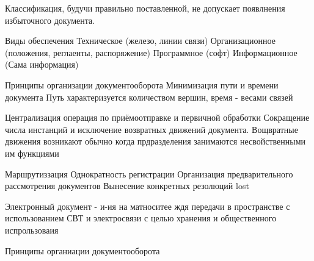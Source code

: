 \documentclass[a4paper,12pt]{report}
\begin{document}
		Классификация, будучи правильно поставленной, не допускает появлнения избыточного документа.

		Виды обеспечения
			Техническое (железо, линии связи)
			Организационное (положения, реглаенты, распоряжение)
			Программное (софт)
			Информационное (Сама информация)



		Принципы организации документооборота
			Минимизация пути и времени документа
			Путь характеризуется количеством вершин, время - весами связей

			Централизация операция по приёмоотправке и первичной обработки
			Сокращение числа инстанций и исключение возвратных движений документа.
				Вощвратные движения возникают обычно когда прдразделения занимаются несвойственными им функциями

			Маршрутиззация
			Однократность регистрации
			Организация предварительного рассмотрения документов
			Вынесение конкретных резолюций
			lost


		Электронный документ - и-ия на матноситее ждя передачи в пространстве с использованием СВТ и электросвязи с целью хранения и общественного испрользоваия



	Принципы органиации документооборота



\end{document}
